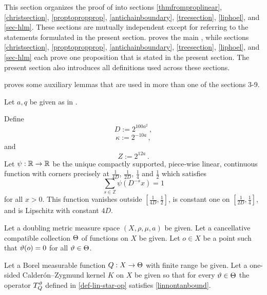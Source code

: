 This section organizes the proof of  into sections \ref{thmfromproplinear}, \ref{christsection}, \ref{proptopropprop}, \ref{antichainboundary}, \ref{treesection}, \ref{liphoel}, and \ref{sec-hlm}. These sections are mutually independent except for referring to the statements formulated in the present section.  proves the main , while sections \ref{christsection}, \ref{proptopropprop}, \ref{antichainboundary}, \ref{treesection}, \ref{liphoel}, and \ref{sec-hlm} each prove one proposition that is stated in the present section. The present section also introduces all definitions used across these sections.

 proves some auxiliary lemmas that are used in more than one of the sections 3-9.

Let $a, q$ be given as in .




Define
\begin{equation}\label{defineD}
    D:= 2^{100 a^2}\, ,
\end{equation}
\begin{equation}\label{definekappa}
    \kappa:= 2^{-10a}\,,
\end{equation}
and
\begin{equation}
    \label{defineZ}
    Z := 2^{12a}\,.
\end{equation}
Let
 $\psi:{\mathbb{R}} \to {\mathbb{R}}$ be the unique compactly supported, piece-wise linear, continuous function with corners precisely at $\frac 1{4D}$, $\frac 1{2D}$, $\frac 14$ and $\frac 12$ which satisfies
 \begin{equation}
    \label{eq-psisum}
    \sum_{s\in \mathbb{Z}} \psi(D^{-s}x)=1
\end{equation}
for all $x>0$. This function vanishes outside $[\frac1{4D},\frac 12]$, is constant one on
$[\frac1{2D},\frac 14]$, and is Lipschitz
with constant $4D$.




Let a doubling metric measure space $(X,\rho,\mu, a)$ be given.
Let a cancellative compatible collection ${\Theta}$ of functions on $X$ be given.
Let $o\in X$ be a point such that ${\vartheta}(o)=0$
for all ${\vartheta}\in {\Theta}$.


Let a Borel measurable function ${Q}:X\to {\Theta}$ with finite range be given.
Let a one-sided Calder\'on--Zygmund kernel $K$ on $X$ be given so that for every ${\vartheta}\in {\Theta}$ the operator $T_{{Q}}^{{\vartheta}}$ defined in \eqref{def-lin-star-op}
satisfies \eqref{linnontanbound}.



